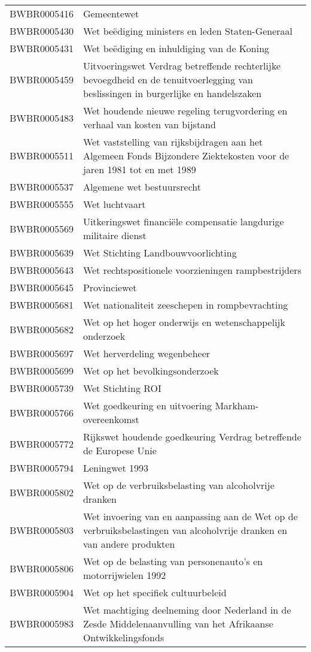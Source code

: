 \begin{longtable}{lp{}}
BWBR0005416 & Gemeentewet \\
BWBR0005430 & Wet beëdiging ministers en leden Staten-Generaal \\
BWBR0005431 & Wet beëdiging en inhuldiging van de Koning \\
BWBR0005459 & Uitvoeringswet Verdrag betreffende rechterlijke bevoegdheid en de tenuitvoerlegging van beslissingen in burgerlijke en handelszaken \\
BWBR0005483 & Wet houdende nieuwe regeling terugvordering en verhaal van kosten van bijstand \\
BWBR0005511 & Wet vaststelling van rijksbijdragen aan het Algemeen Fonds Bijzondere Ziektekosten voor de jaren 1981 tot en met 1989 \\
BWBR0005537 & Algemene wet bestuursrecht \\
BWBR0005555 & Wet luchtvaart \\
BWBR0005569 & Uitkeringswet financiële compensatie langdurige militaire dienst \\
BWBR0005639 & Wet Stichting Landbouwvoorlichting \\
BWBR0005643 & Wet rechtspositionele voorzieningen rampbestrijders \\
BWBR0005645 & Provinciewet \\
BWBR0005681 & Wet nationaliteit zeeschepen in rompbevrachting \\
BWBR0005682 & Wet op het hoger onderwijs en wetenschappelijk onderzoek \\
BWBR0005697 & Wet herverdeling wegenbeheer \\
BWBR0005699 & Wet op het bevolkingsonderzoek  \\
BWBR0005739 & Wet Stichting ROI \\
BWBR0005766 & Wet goedkeuring en uitvoering Markham-overeenkomst \\
BWBR0005772 & Rijkswet houdende goedkeuring Verdrag betreffende de Europese Unie \\
BWBR0005794 & Leningwet 1993 \\
BWBR0005802 & Wet op de verbruiksbelasting van alcoholvrije dranken \\
BWBR0005803 & Wet invoering van en aanpassing aan de Wet op de verbruiksbelastingen van alcoholvrije dranken en van andere produkten \\
BWBR0005806 & Wet op de belasting van personenauto's en motorrijwielen 1992 \\
BWBR0005904 & Wet op het specifiek cultuurbeleid \\
BWBR0005983 & Wet machtiging deelneming door Nederland in de Zesde Middelenaanvulling van het Afrikaanse Ontwikkelingsfonds \\

\end{longtable}
